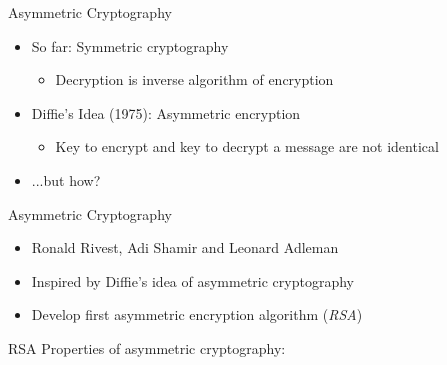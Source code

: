 \documentclass[handout]{beamer}
\begin{document}
\begin{frame}{Asymmetric Cryptography}
	\begin{itemize}
		\item<1-> So far: Symmetric cryptography
		\begin{itemize}
			\item<1->Decryption is inverse algorithm of encryption
		\end{itemize}
		\item<2-> Diffie's Idea (1975): Asymmetric encryption
		\begin{itemize}
			\item<2->Key to encrypt and key to decrypt a message are not identical
		\end{itemize}
		\item<3->...but how?
	\end{itemize}
\end{frame}

\begin{frame}{Asymmetric Cryptography}
	\begin{itemize}
		\item<1-> Ronald Rivest, Adi Shamir and Leonard Adleman
		\item<2-> Inspired by Diffie's idea of asymmetric cryptography
		\item<3-> Develop first asymmetric encryption algorithm (\textit{RSA}) \cite{rivest1978}
	\end{itemize}
\end{frame}

\begin{frame}{RSA}
	Properties of asymmetric cryptography:
	\vspace{0.4cm}
	\begin{figure}
		\centering
		
	\end{figure}
\end{frame}
\end{document}
